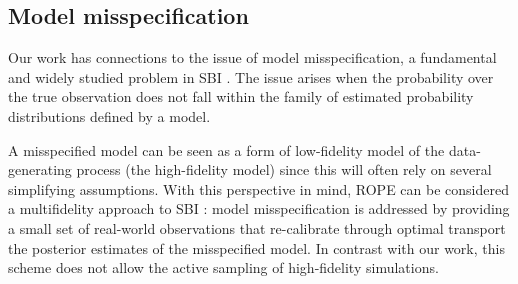


\subsection{Model misspecification} 

Our work has connections to the issue of model misspecification, a fundamental and widely studied problem in SBI \cite{gao_generalized_2023, ward_robust_2022, huang_learning_2023, frazier_synthetic_2024, adachi_reversal_2010, schmitt_detecting_2024, cannon_investigating_2022}. The issue arises when the probability over the true observation does not fall within the family of estimated probability distributions defined by a model.

A misspecified model can be seen as a form of low-fidelity model of the data-generating process (the high-fidelity model) since this will often rely on several simplifying assumptions.
With this perspective in mind, ROPE can be considered a multifidelity approach to SBI \cite{wehenkel_addressing_2024}: model misspecification is addressed by providing a small set of real-world observations that re-calibrate through optimal transport the posterior estimates of the misspecified model. In contrast with our work, this scheme does not allow the active sampling of high-fidelity simulations. 


